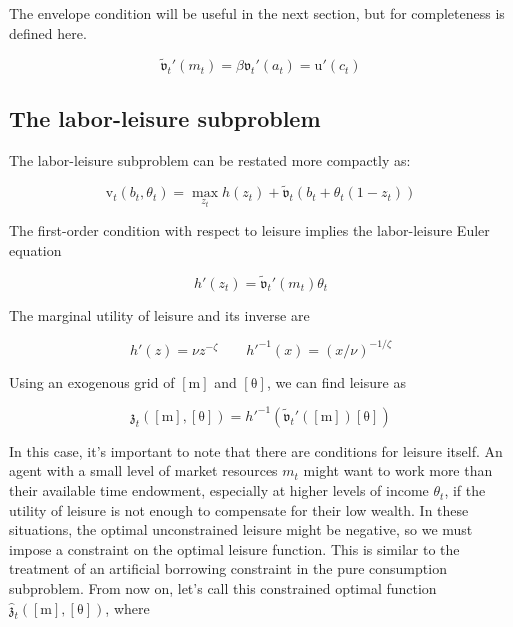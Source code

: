 \documentclass{article}
\newcommand{\DiscFac}{\beta}
\newcommand{\utilFunc}{\mathrm{u}}
\newcommand{\tShkEmp}{\theta}
\newcommand{\labShare}{\nu}
\newcommand{\leiShare}{\zeta}
\newcommand{\h}{h}
\newcommand{\bRat}{b}
\newcommand{\leisure}{z}
\newcommand{\cRat}{c}
\newcommand{\vFunc}{\mathrm{v}}
\newcommand{\aRat}{a}
\newcommand{\mRat}{m}
\newcommand{\vOpt}{\tilde{\mathfrak{v}}}
\newcommand{\vEnd}{\mathfrak{v}}
\newcommand{\xRat}{x}
\newcommand{\mMat}{[\mathrm{m}]}
\newcommand{\tShkMat}{[\mathrm{\tShkEmp}]}
\newcommand{\zEndFunc}{\mathfrak{z}}
\begin{document}
The envelope condition will be useful in the next section, but for completeness
is defined here.

\begin{equation}
\vOpt_{t}'(\mRat_{t}) = \DiscFac \vEnd_{t}'(\aRat_{t}) = \utilFunc'(\cRat_{t})
\end{equation}

\subsection{The labor-leisure subproblem}\label{The labor-leisure subproblem}

The labor-leisure subproblem can  be restated more compactly as:

\begin{equation}
\vFunc_{t}(\bRat_{t}, \tShkEmp_{t}) = \max_{ \leisure_{t}}
  \h(\leisure_{t}) + \vOpt_{t}(\bRat_{t} +
  \tShkEmp_{t}(1-\leisure_{t}))
\end{equation}

The first-order condition with respect to leisure implies the labor-leisure Euler equation

\begin{equation}
\h'(\leisure_{t}) = \vOpt_{t}'(\mRat_{t}) \tShkEmp_{t}
\end{equation}

The marginal utility of leisure and its inverse are

\begin{equation}
\h'(\leisure) = \labShare\leisure^{-\leiShare} \qquad
  \h'^{-1}(\xRat) = (\xRat/\labShare)^{-1/\leiShare}
\end{equation}

Using an exogenous grid of $\mMat$ and $\tShkMat$, we can find leisure as

\begin{equation}
\zEndFunc_{t}(\mMat, \tShkMat) = \h'^{-1}\left(
  \vOpt_{t}'(\mMat) \tShkMat \right)
\end{equation}

In this case, it's important to note that there are conditions for leisure itself. An agent with a small level of market resources $\mRat_{t}$ might want to work more than their available time endowment, especially at higher levels of income $\tShkEmp_{t}$, if the utility of leisure is not enough to compensate for their low wealth. In these situations, the optimal unconstrained leisure might be negative, so we must impose a constraint on the optimal leisure function. This is similar to the treatment of an artificial borrowing constraint in the pure consumption subproblem. From now on, let's call this constrained optimal function $\hat{\zEndFunc}_{t}(\mMat, \tShkMat)$, where
\end{document}
